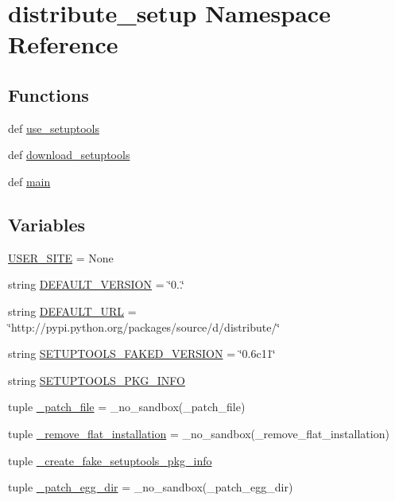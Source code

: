 \hypertarget{namespacedistribute__setup}{}\section{distribute\+\_\+setup Namespace Reference}
\label{namespacedistribute__setup}
\subsection*{Functions}
\begin{DoxyCompactItemize}
\item 
def \hyperlink{namespacedistribute__setup_a11a438d9e387c1693d855a38ecfca8f4}{use\+\_\+setuptools}
\item 
def \hyperlink{namespacedistribute__setup_a4e6774bf3cd6d829c23783074221de6c}{download\+\_\+setuptools}
\item 
def \hyperlink{namespacedistribute__setup_a50acaefaa5b8daa6484042ec94a83060}{main}
\end{DoxyCompactItemize}
\subsection*{Variables}
\begin{DoxyCompactItemize}
\item 
\hyperlink{namespacedistribute__setup_a5d357a3ee08a73ac82117cbc3141e5e9}{U\+S\+E\+R\+\_\+\+S\+I\+T\+E} = None
\item 
string \hyperlink{namespacedistribute__setup_a12c948c3e1c2c9a9c27118d15aec67c9}{D\+E\+F\+A\+U\+L\+T\+\_\+\+V\+E\+R\+S\+I\+O\+N} = \char`\"{}0..\char`\"{}
\item 
string \hyperlink{namespacedistribute__setup_ac84bcd689ab0e7662547bc4fe2b34501}{D\+E\+F\+A\+U\+L\+T\+\_\+\+U\+R\+L} = \char`\"{}http\+://pypi.\+python.\+org/packages/source/d/distribute/\char`\"{}
\item 
string \hyperlink{namespacedistribute__setup_a8986a7763ae6409418bcea53e3444d36}{S\+E\+T\+U\+P\+T\+O\+O\+L\+S\+\_\+\+F\+A\+K\+E\+D\+\_\+\+V\+E\+R\+S\+I\+O\+N} = \char`\"{}0.\+6c11\char`\"{}
\item 
string \hyperlink{namespacedistribute__setup_a5cc6a629ad34b8a647ca28a5a5860782}{S\+E\+T\+U\+P\+T\+O\+O\+L\+S\+\_\+\+P\+K\+G\+\_\+\+I\+N\+F\+O}
\item 
tuple \hyperlink{namespacedistribute__setup_a1c2dcc7490dabc2f582e7b2a9b0a283b}{\+\_\+patch\+\_\+file} = \+\_\+no\+\_\+sandbox(\+\_\+patch\+\_\+file)
\item 
tuple \hyperlink{namespacedistribute__setup_afec924cde796b58fe334583a0755c618}{\+\_\+remove\+\_\+flat\+\_\+installation} = \+\_\+no\+\_\+sandbox(\+\_\+remove\+\_\+flat\+\_\+installation)
\item 
tuple \hyperlink{namespacedistribute__setup_a8f94c0ef2cac9d45c7ba6a1a5cf27333}{\+\_\+create\+\_\+fake\+\_\+setuptools\+\_\+pkg\+\_\+info}
\item 
tuple \hyperlink{namespacedistribute__setup_af9a683753bcf311379e9bd2d1e2100fa}{\+\_\+patch\+\_\+egg\+\_\+dir} = \+\_\+no\+\_\+sandbox(\+\_\+patch\+\_\+egg\+\_\+dir)
\end{DoxyCompactItemize}


